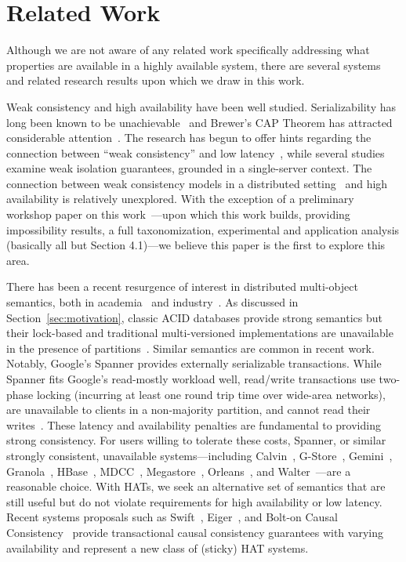 
\section{Related Work}

Although we are not aware of any related work specifically addressing
what properties are available in a highly available system, there are
several systems and related research results upon which we draw in
this work.

Weak consistency and high availability have been well
studied. Serializability has long been known to be
unachievable~\cite{davidson-survey} and Brewer's CAP Theorem has
attracted considerable attention~\cite{gilbert-cap}. The research has
begun to offer hints regarding the connection between ``weak
consistency'' and low latency~\cite{abadi-pacelc}, while several
studies~\cite{adya, ansicritique} examine weak isolation guarantees,
grounded in a single-server context. The connection between weak
consistency models in a distributed setting~\cite{calm, crdt} and high
availability is relatively unexplored. With the exception of a
preliminary workshop paper on this work~\cite{hat-hotos}---upon which
this work builds, providing impossibility results, a full
taxonomization, experimental and application analysis (basically all
but Section 4.1)---we believe this paper is the first to explore this
area.

There has been a recent resurgence of interest in distributed
multi-object semantics, both in academia~\cite{kraska-s3, granola,
  gstore, mdcc, redblue, cops, eiger, walter,calvin, swift} and
industry~\cite{megastore, orleans, spanner}. As discussed in
Section~\ref{sec:motivation}, classic ACID databases provide strong
semantics but their lock-based and traditional multi-versioned
implementations are unavailable in the presence of
partitions~\cite{bernstein-concurrency, bernstein-book,
  gray-isolation}. Similar semantics are common in recent
work. Notably, Google's Spanner provides externally serializable
transactions. While Spanner fits Google's read-mostly workload well,
read/write transactions use two-phase locking (incurring at least one
round trip time over wide-area networks), are unavailable to clients
in a non-majority partition, and cannot read their
writes~\cite{spanner}. These latency and availability penalties are
fundamental to providing strong consistency. For users willing to
tolerate these costs, Spanner, or similar strongly consistent,
unavailable systems---including Calvin~\cite{calvin},
G-Store~\cite{gstore}, Gemini~\cite{redblue}, Granola~\cite{granola},
HBase~\cite{hbase}, MDCC~\cite{mdcc}, Megastore~\cite{megastore},
Orleans~\cite{orleans}, and Walter~\cite{walter}---are a reasonable
choice. With HATs, we seek an alternative set of semantics that are
still useful but do not violate requirements for high availability or
low latency. Recent systems proposals such as Swift~\cite{swift},
Eiger~\cite{eiger}, and Bolt-on Causal Consistency~\cite{bolton}
provide transactional causal consistency guarantees with varying
availability and represent a new class of (sticky) HAT systems.
